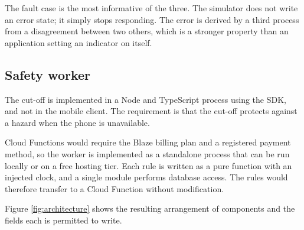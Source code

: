 \documentclass[11pt,a4paper]{article}
\begin{document}
The fault case is the most informative of the three. The simulator does not
write an error state; it simply stops responding. The error is derived by a
third process from a disagreement between two others, which is a stronger
property than an application setting an indicator on itself.

\subsection{Safety worker}

The cut-off is implemented in a Node and TypeScript process using the
 SDK, and not in the mobile client. The requirement is that
the cut-off protects against a hazard when the phone is unavailable.

Cloud Functions would require the Blaze billing plan and a registered payment
method, so the worker is implemented as a standalone process that can be run
locally or on a free hosting tier. Each rule is written as a pure function with
an injected clock, and a single module performs database access. The rules would
therefore transfer to a Cloud Function without modification.

Figure \ref{fig:architecture} shows the resulting arrangement of components and
the fields each is permitted to write.
\end{document}
